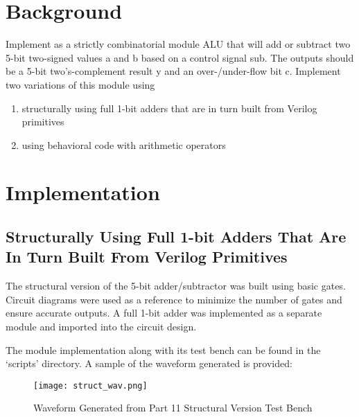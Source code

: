 \documentclass[paper=usletter, fontsize=12pt]{article}
\begin{document}
    \vspace{-0.1in}

    \section{Background}
    Implement as a strictly combinatorial module ALU that will add or subtract two 5-bit two-signed values a and b based on a control signal sub. The outputs should be a 5-bit two’s-complement result y and an over-/under-flow bit c. Implement two variations of this module using
    \begin{enumerate}[label=\alph*)]
        \item structurally using full 1-bit adders that are in turn built from Verilog primitives
        \item using behavioral code with arithmetic operators
    \end{enumerate}

    \section{Implementation}
        \subsection{Structurally Using Full 1-bit Adders That Are In Turn Built From Verilog Primitives}
        The structural version of the 5-bit adder/subtractor was built using basic gates. Circuit diagrams were used as a reference to minimize the number of gates and ensure accurate outputs. A full 1-bit adder was implemented as a separate module and imported into the circuit design.

        The module implementation along with its test bench can be found in the `scripts' directory. A sample of the waveform generated is provided:

        \begin{figure}[ht]
            \begin{center}
                \texttt{[image: struct\_wav.png]}
                \caption{Waveform Generated from Part 11 Structural Version Test Bench} \label{fig:struct_wav}
            \end{center}
        \end{figure}
\end{document}
